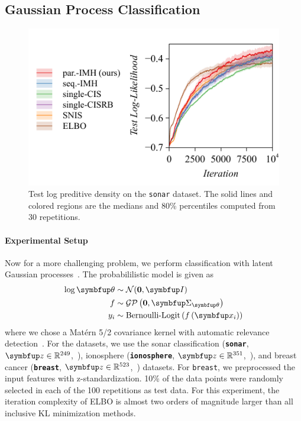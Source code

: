 \subsection{Gaussian Process Classification}\label{section:bgp}
%
\begin{figure}[H]
  \centering
     \includegraphics[scale=0.75]{figures/sonar_01.pdf}
  \caption{Test log preditive density on the \texttt{sonar} dataset.
    The solid lines and colored regions are the medians and 80\% percentiles computed from 30 repetitions.
  }\label{fig:logistic}
\end{figure}
%

%
\paragraph{Experimental Setup}
Now for a more challenging problem, we perform classification with latent Gaussian processes~\citep{rasmussen_gaussian_2006, NIPS2014_8c6744c9}.
The probabililistic model is given as
\begin{align*}
  \log \vtheta &\sim \mathcal{N}(\mathbf{0}, \mI) \\
   f &\sim \mathcal{GP}\left(\mathbf{0}, \mSigma_{\vtheta}\right) \\
   y_i &\sim \text{Bernoulli-Logit}\left(  f\left( \vx_i \right) \right)
\end{align*}
where we chose a Mat\'ern 5/2 covariance kernel with automatic relevance detection~\citep{neal_bayesian_1996}.
For the datasets, we use the sonar classification (\textbf{\texttt{sonar}}, \(\vz \in \mathbb{R}^{249}\),~\citealt{gorman_analysis_1988}), ionosphere (\textbf{\texttt{ionosphere}}, \(\vz \in \mathbb{R}^{351}\),~\citealt{Sigillito1989ClassificationOR}), and breast cancer (\textbf{\texttt{breast}}, \(\vz \in \mathbb{R}^{523}\),~\citealt{wolberg_multisurface_1990}) datasets.
For \texttt{breast}, we preprocessed the input features with z-standardization.
10\% of the data points were randomly selected in each of the 100 repetitions as test data.
For this experiment, the iteration complexity of ELBO is almost two orders of magnitude larger than all inclusive KL minimization methods.

